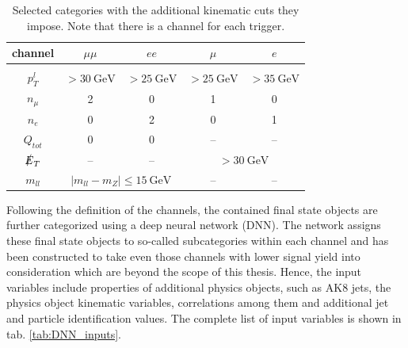 \begin{table}[h!]
	\centering
	\begin{tabular}{ccccc}
		channel & $\mu\mu$ & $ee$ & $\mu$ & $e$ \\
		\hline \hline \\
		$p^l_T$ & $>\SI{30}{\giga\electronvolt}$ & $>\SI{25}{\giga\electronvolt}$ & $>\SI{25}{\giga\electronvolt}$ & $>\SI{35}{\giga\electronvolt}$ \\
		$n_\mu$ & 2 & 0 & 1 & 0 \\
		$n_e$ & 0 & 2 & 0 & 1 \\
		$Q_{tot}$ & 0 & 0 & -- & -- \\
		$\slashed{E}_T$ & -- & -- & \multicolumn{2}{c}{$>\SI{30}{\giga\electronvolt}$}  \\
		$m_{ll}$ & \multicolumn{2}{c}{$|m_{ll}-m_Z|\leq\SI{15}{\giga\electronvolt}$} & -- & -- \\
	\end{tabular}
	\caption{Selected categories with the additional kinematic cuts they impose. Note that there is a channel for each trigger.}
	\label{tab:categories}
\end{table}


Following the definition of the channels, the contained final state objects are further categorized using a deep neural network (DNN). The network assigns these final state objects to so-called subcategories within each channel and has been constructed to take even those channels with lower signal yield into consideration which are beyond the scope of this thesis. Hence, the input variables include properties of additional physics objects, such as AK8 jets, the physics object kinematic variables, correlations among them and additional jet and particle identification values. The complete list of input variables is shown in tab. \ref{tab:DNN_inputs}.

